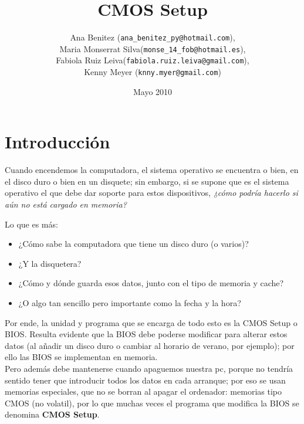 \documentclass[12pt,oneside,a4paper]{article}
\begin{document}
\title{CMOS Setup}
\author{Ana Benitez (\texttt{ana\_benitez\_py@hotmail.com}), \\
		Maria Monserrat Silva(\texttt{monse\_14\_fob@hotmail.es}), \\
		Fabiola Ruiz Leiva(\texttt{fabiola.ruiz.leiva@gmail.com}), \\ 
		Kenny Meyer (\texttt{knny.myer@gmail.com})}
\date{Mayo 2010}
\maketitle
\clearpage

%
\setcounter{tocdepth}{4}
\tableofcontents

\newpage

\section{Introducción}{\label{sec:introduccion}}

Cuando encendemos la computadora, el sistema operativo se encuentra o bien, en
el disco duro o bien en un disquete; sin embargo, si se supone que es el
sistema operativo el que debe dar soporte para estos dispositivos, {\em ¿cómo podría
hacerlo si aún no está cargado en memoria?}

Lo que es más:
\begin{itemize}
	\item ¿Cómo sabe la computadora que tiene un disco duro (o varios)?
	\item ¿Y la disquetera?  
	\item ¿Cómo y dónde guarda esos datos, junto con el tipo de memoria y cache?
	\item ¿O algo tan sencillo pero importante como la fecha y la hora? 
\end{itemize}

Por ende, la unidad y programa que se encarga de todo esto es la CMOS Setup o BIOS.
Resulta evidente que la BIOS debe poderse modificar para alterar estos datos
(al añadir un disco duro o cambiar al horario de verano, por ejemplo); por ello
las BIOS se implementan en memoria. \\
Pero además debe mantenerse cuando apaguemos nuestra pc, porque no tendría
sentido tener que introducir todos los datos en cada arranque; por eso se usan
memorias especiales, que no se borran al apagar el ordenador: memorias tipo
CMOS (no volatil), por lo que muchas veces el programa que modifica la BIOS se
denomina {\bf CMOS Setup}.
\end{document}
